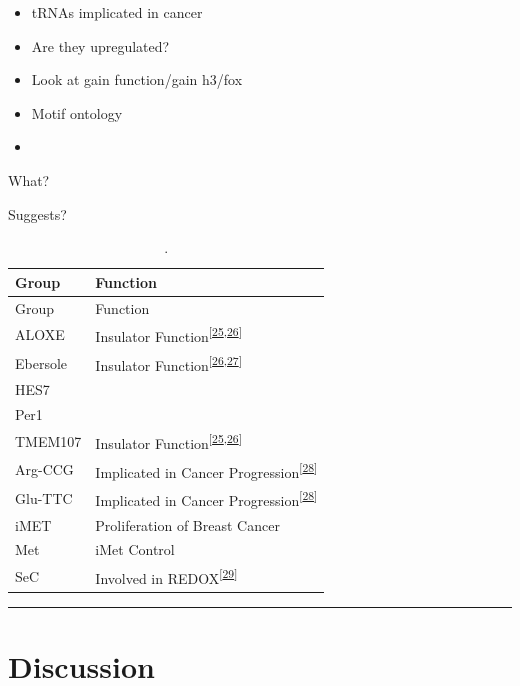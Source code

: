 \documentclass[
  12pt,
]{article}
\begin{document}
\begin{itemize}
\item
  tRNAs implicated in cancer
\item
  Are they upregulated?
\item
  Look at gain function/gain h3/fox
\item
  Motif ontology
\item
\end{itemize}

What?

Suggests?

\begin{longtable}[]{@{}ll@{}}
\caption{\label{tab:clusters}.}\tabularnewline
\toprule()
Group & Function \\
\midrule()
\endfirsthead
\toprule()
Group & Function \\
\midrule()
\endhead
ALOXE & Insulator Function\textsuperscript{{[}\protect\hyperlink{ref-raab2011}{25},\protect\hyperlink{ref-sizer2022}{26}{]}} \\
Ebersole & Insulator Function\textsuperscript{{[}\protect\hyperlink{ref-sizer2022}{26},\protect\hyperlink{ref-Ebersole2011}{27}{]}} \\
HES7 & \\
Per1 & \\
TMEM107 & Insulator Function\textsuperscript{{[}\protect\hyperlink{ref-raab2011}{25},\protect\hyperlink{ref-sizer2022}{26}{]}} \\
Arg-CCG & Implicated in Cancer Progression\textsuperscript{{[}\protect\hyperlink{ref-Goodarzi2016}{28}{]}} \\
Glu-TTC & Implicated in Cancer Progression\textsuperscript{{[}\protect\hyperlink{ref-Goodarzi2016}{28}{]}} \\
iMET & Proliferation of Breast Cancer \\
Met & iMet Control \\
SeC & Involved in REDOX\textsuperscript{{[}\protect\hyperlink{ref-Sangha2022}{29}{]}} \\
\bottomrule()
\end{longtable}

\begin{center}\rule{0.5\linewidth}{0.5pt}\end{center}

\hypertarget{discussion}{%
\section{Discussion}\label{discussion}}
\end{document}
